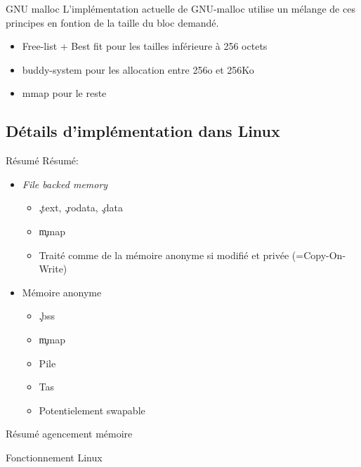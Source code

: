 \begin{frame}[fragile=singleslide]{GNU malloc}
  L'implémentation actuelle de  GNU-malloc utilise un mélange de
  ces principes en fontion de la taille du bloc demandé.
  \begin{itemize}
  \item Free-list + Best fit pour les tailles inférieure à 256 octets
  \item buddy-system pour les allocation entre 256o et 256Ko
  \item mmap pour le reste
  \end{itemize}
\end{frame}

\subsection{Détails d'implémentation dans Linux}

\begin{frame}[fragile=singleslide]{Résumé}
  Résumé:
  \begin{itemize}
  \item \emph{File backed memory}
    \begin{itemize}
    \item \c{.text}, \c{.rodata}, \c{.data}
    \item \c{mmap}
    \item Traité comme de la mémoire anonyme si modifié et privée (=Copy-On-Write)
    \end{itemize}
  \item Mémoire anonyme
    \begin{itemize}
    \item \c{.bss}
    \item \c{mmap}
    \item Pile
    \item Tas
    \item Potentielement swapable
    \end{itemize}
  \end{itemize}
\end{frame}

\begin{frame}[fragile=singleslide]{Résumé agencement mémoire}
\end{frame}

\begin{frame}[fragile=singleslide]{Fonctionnement Linux}
\end{frame}

